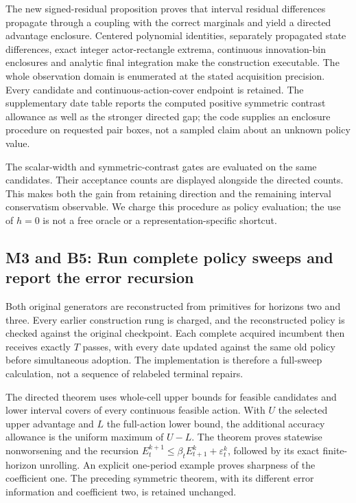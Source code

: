 The new signed-residual proposition proves that interval residual
differences propagate through a coupling with the correct marginals and
yield a directed advantage enclosure. Centered polynomial identities,
separately propagated state differences, exact integer actor-rectangle
extrema, continuous innovation-bin enclosures and analytic final
integration make the construction executable. The whole observation
domain is enumerated at the stated acquisition precision. Every
candidate and continuous-action-cover endpoint is retained. The
supplementary date table reports the computed positive symmetric
contrast allowance as well as the stronger directed gap; the code
supplies an enclosure procedure on requested pair boxes, not a sampled
claim about an unknown policy value.

The scalar-width and symmetric-contrast gates are evaluated on the same
candidates. Their acceptance counts are displayed alongside the directed
counts. This makes both the gain from retaining direction and the
remaining interval conservatism observable. We charge this procedure as
policy evaluation; the use of \(h=0\) is not a free oracle or a
representation-specific shortcut.

\hypertarget{m3-and-b5-run-complete-policy-sweeps-and-report-the-error-recursion}{%
\subsection{M3 and B5: Run complete policy sweeps and report the error
recursion}\label{m3-and-b5-run-complete-policy-sweeps-and-report-the-error-recursion}}

Both original generators are reconstructed from primitives for horizons
two and three. Every earlier construction rung is charged, and the
reconstructed policy is checked against the original checkpoint. Each
complete acquired incumbent then receives exactly \(T\) passes, with
every date updated against the same old policy before simultaneous
adoption. The implementation is therefore a full-sweep calculation, not
a sequence of relabeled terminal repairs.

The directed theorem uses whole-cell upper bounds for feasible
candidates and lower interval covers of every continuous feasible
action. With \(U\) the selected upper advantage and \(L\) the
full-action lower bound, the additional accuracy allowance is the
uniform maximum of \(U-L\). The theorem proves statewise nonworsening
and the recursion \(E_t^{k+1}\leq\beta_t E_{t+1}^k+\varepsilon_t^k\),
followed by its exact finite-horizon unrolling. An explicit one-period
example proves sharpness of the coefficient one. The preceding symmetric
theorem, with its different error information and coefficient two, is
retained unchanged.

